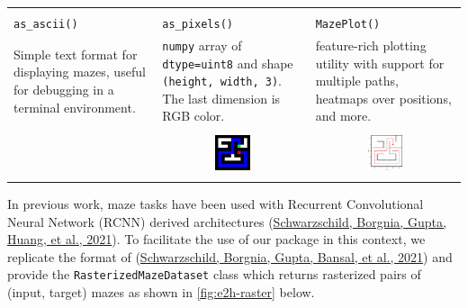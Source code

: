 \documentclass[10pt,a4paper,onecolumn]{article}
\let\origfigure\figure
\let\endorigfigure\endfigure
\renewenvironment{figure}[1][2] {
    \expandafter\origfigure\expandafter[H]
} {
    \endorigfigure
}
\begin{document}
\begin{figure}[H]
  \centering
  \begin{tabular}{p{1.5in} p{1.5in} p{1.5in}} 
    \hline \\[.5em]
    \texttt{as\_ascii()} & \texttt{as\_pixels()} & \texttt{MazePlot()} \\[.5em]
      Simple text format for displaying mazes, useful for debugging in a terminal environment.
      & \texttt{numpy} array of \texttt{dtype=uint8} and shape \texttt{(height, width, 3)}. The last dimension is RGB color.
      & feature-rich plotting utility with support for multiple paths, heatmaps over positions, and more. \\[1em]
    \hline \\
      \multicolumn{1}{c}{\begin{minipage}[b]{1.6in}
        \setlength{\baselineskip}{0.9em}
         
      \end{minipage}}
      & \multicolumn{1}{c}{
        \includegraphics[width=0.25\textwidth]{figures/outputs-pixels.pdf}
      }
      & \multicolumn{1}{c}{
        \includegraphics[width=0.25\textwidth, trim={0 0 -.3cm, -.5cm}, clip]{figures/outputs-mazeplot.pdf}
      } \\[1em]
    
    \hline \\
  \end{tabular}
  \caption{Various output formats. Top row (left to right): ASCII diagram, rasterized pixel grid, and advanced display.}
  \label{fig:output-fmts}
\end{figure}

In previous work, maze tasks have been used with Recurrent Convolutional
Neural Network (RCNN) derived architectures
(\protect\hyperlink{ref-deepthinking}{Schwarzschild, Borgnia, Gupta,
Huang, et al., 2021}). To facilitate the use of our package in this
context, we replicate the format of
(\protect\hyperlink{ref-easy_to_hard}{Schwarzschild, Borgnia, Gupta,
Bansal, et al., 2021}) and provide the \texttt{RasterizedMazeDataset}
class which returns rasterized pairs of (input, target) mazes as shown
in \autoref{fig:e2h-raster} below.
\end{document}
